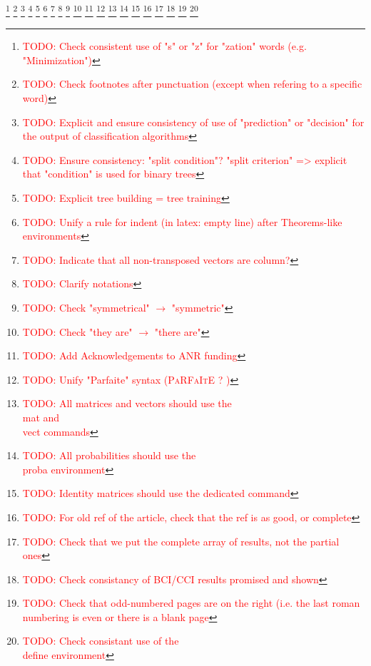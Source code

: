 \documentclass[a4paper, 12pt, openright]{book}
\newcommand{\todo}[1]{%
\textcolor{red}{\footnote{\textcolor{red}{TODO: #1}}}}
\newcommand{\define}[1]{\textbf{#1}}
\newcommand{\vect}[1]{\boldsymbol{#1}}
\newcommand{\mat}[1]{\boldsymbol{#1}}
\newcommand{\proba}[1]{\mathbb{P}\left(#1\right)}
\begin{document}
\diplayFirstPage




\printbibliography

\todo{Check consistent use of "s" or "z" for "zation" words (e.g. "Minimization")}
\todo{Check footnotes after punctuation (except when refering to a specific word)}
\todo{Explicit and ensure consistency of use of "prediction" or "decision" for the output of classification algorithms}
\todo{Ensure consistency: "split condition"? "split criterion" => explicit that "condition" is used for binary trees}
\todo{Explicit tree building = tree training}
\todo{Unify a rule for indent (in latex: empty line) after Theorems-like environments}
\todo{Indicate that all non-transposed vectors are column?}
\todo{Clarify notations}
\todo{Check "symmetrical" $\rightarrow$ "symmetric"}
\todo{Check "they are" $\rightarrow$ "there are"}
\todo{Add Acknowledgements to ANR funding}
\todo{Unify "Parfaite" syntax (\textsc{PaRFaItE} ? )}
\todo{All matrices and vectors should use the \\mat and \\vect commands}
\todo{All probabilities should use the \\proba environment}
\todo{Identity matrices should use the dedicated command}
\todo{For old ref of the article, check that the ref is as good, or complete}
\todo{Check that we put the complete array of results, not the partial ones}
\todo{Check consistancy of BCI/CCI results promised and shown}
\todo{Check that odd-numbered pages are on the right (i.e. the last roman numbering is even or there is a blank page}
\todo{Check consistant use of the \\define environment}
\diplayLastPage
\end{document}

